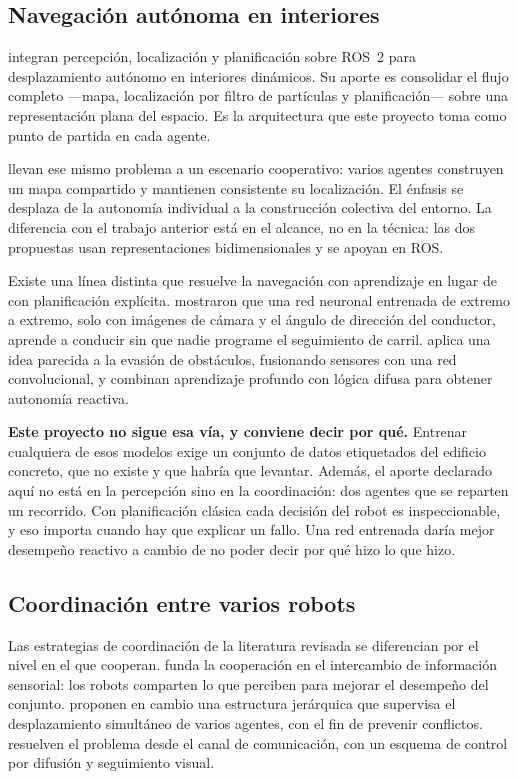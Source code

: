 \subsection{Navegación autónoma en interiores}

\textcite{sojan2025autonomous} integran percepción, localización y planificación
sobre ROS~2 para desplazamiento autónomo en interiores dinámicos. Su aporte es
consolidar el flujo completo —mapa, localización por filtro de partículas y
planificación— sobre una representación plana del espacio. Es la arquitectura
que este proyecto toma como punto de partida en cada agente.

\textcite{varghese2023multirobot} llevan ese mismo problema a un escenario
cooperativo: varios agentes construyen un mapa compartido y mantienen
consistente su localización. El énfasis se desplaza de la autonomía individual a
la construcción colectiva del entorno. La diferencia con el trabajo anterior está
en el alcance, no en la técnica: las dos propuestas usan representaciones
bidimensionales y se apoyan en ROS.

Existe una línea distinta que resuelve la navegación con aprendizaje en lugar de
con planificación explícita. \textcite{bojarski2016end} mostraron que una red
neuronal entrenada de extremo a extremo, solo con imágenes de cámara y el ángulo
de dirección del conductor, aprende a conducir sin que nadie programe el
seguimiento de carril. \textcite{zain2025obstacle} aplica una idea parecida a la
evasión de obstáculos, fusionando sensores con una red convolucional, y
\textcite{lopez2024enhancing} combinan aprendizaje profundo con lógica difusa
para obtener autonomía reactiva.

\textbf{Este proyecto no sigue esa vía, y conviene decir por qué.} Entrenar
cualquiera de esos modelos exige un conjunto de datos etiquetados del edificio
concreto, que no existe y que habría que levantar. Además, el aporte declarado
aquí no está en la percepción sino en la coordinación: dos agentes que se
reparten un recorrido. Con planificación clásica cada decisión del robot es
inspeccionable, y eso importa cuando hay que explicar un fallo. Una red
entrenada daría mejor desempeño reactivo a cambio de no poder decir por qué hizo
lo que hizo.

\subsection{Coordinación entre varios robots}

Las estrategias de coordinación de la literatura revisada se diferencian por el
nivel en el que cooperan. \textcite{nair2024collaborative} funda la cooperación
en el intercambio de información sensorial: los robots comparten lo que perciben
para mejorar el desempeño del conjunto. \textcite{roszkowska2023multilevel}
proponen en cambio una estructura jerárquica que supervisa el desplazamiento
simultáneo de varios agentes, con el fin de prevenir conflictos.
\textcite{rudrusamy2022broadcast} resuelven el problema desde el canal de
comunicación, con un esquema de control por difusión y seguimiento visual.

